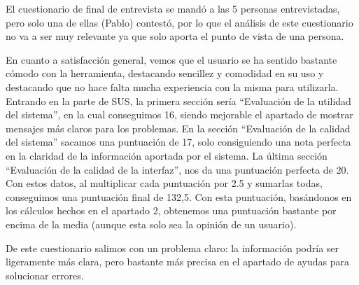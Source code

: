 El cuestionario de final de entrevista se mandó a las 5 personas entrevistadas, pero solo una de ellas (Pablo) contestó, por lo que el análisis de este cuestionario no va a ser muy relevante ya que solo aporta el punto de vista de una persona.

En cuanto a satisfacción general, vemos que el usuario se ha sentido bastante cómodo con la herramienta, destacando sencillez y comodidad en su uso y destacando que no hace falta mucha experiencia con la misma para utilizarla.
Entrando en la parte de SUS, la primera sección sería ``Evaluación de la utilidad del sistema'', en la cual conseguimos 16, siendo mejorable el apartado de mostrar mensajes más claros para los problemas.
En la sección ``Evaluación de la calidad del sistema'' sacamos una puntuación de 17, solo consiguiendo una nota perfecta en la claridad de la información aportada por el sistema.
La última sección ``Evaluación de la calidad de la interfaz'', nos da una puntuación perfecta de 20. Con estos datos, al multiplicar cada puntuación por 2.5 y sumarlas todas, conseguimos una puntuación final de 132,5. Con esta puntuación, basándonos en los cálculos hechos en el apartado 2, obtenemos una puntuación bastante por encima de la media (aunque esta solo sea la opinión de un usuario).

De este cuestionario salimos con un problema claro: la información podría ser ligeramente más clara, pero bastante más precisa en el apartado de ayudas para solucionar errores.